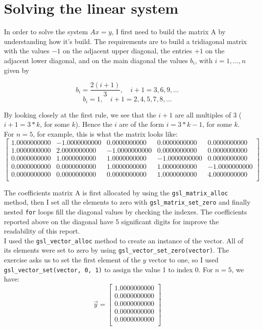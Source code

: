 \documentclass{article}
\newcommand{\code}{\texttt}
\begin{document}
\section{Solving the linear system}
In order to solve the system $Ax=y$, I first need to build the matrix A by understanding how it's build. The requirements are to build a tridiagonal matrix with the values $-1$ on the adjacent upper diagonal, the entries $+1$ on the adjacent lower diagonal, and on the main diagonal the values $b_{i}$, with $i = 1, \ldots, n$ given by

$$b_i =\frac{2(i+1)}{3},\quad i + 1= 3, 6, 9,\ldots$$
$$b_i =1,\quad i + 1 = 2, 4, 5, 7, 8, \ldots$$

By looking closely at the first rule, we see that the $i+1$ are all multiples of 3 ($i+1 = 3*k$, for some $k$). Hence the $i$ are of the form $i = 3*k-1$, for some $k$. For $n = 5$, for example, this is what the matrix looks like:
$$
\begin{bmatrix}
1.0000000000 & -1.0000000000 & 0.0000000000 & 0.0000000000 & 0.0000000000 \\
1.0000000000 & 2.0000000000 & -1.0000000000 & 0.0000000000 & 0.0000000000 \\
0.0000000000 & 1.0000000000 & 1.0000000000 & -1.0000000000 & 0.0000000000 \\ 
0.0000000000 & 0.0000000000 & 1.0000000000 & 1.0000000000 & -1.0000000000 \\ 
0.0000000000 & 0.0000000000 & 0.0000000000 & 1.0000000000 & 4.0000000000 \\\end{bmatrix}
$$

The coefficients matrix A is first allocated by using the \code{gsl\_matrix\_alloc} method, then I set all the elements to zero with \code{gsl\_matrix\_set\_zero} and finally nested \code{for} loops fill the diagonal values by checking the indexes. The coefficients reported above on the diagonal have 5 significant digits for improve the readability of this report.\\

I used the \code{gsl\_vector\_alloc} method to create an instance of the vector. All of its elements were set to zero by using \code{gsl\_vector\_set\_zero(vector)}. The exercise asks us to set the first element of the $y$ vector to one, so I used \code{gsl\_vector\_set(vector, 0, 1)} to assign the value 1 to index 0. For $n=5$, we have:
$$
\vec{y}=
\begin{bmatrix}
1.0000000000 \\
0.0000000000 \\
0.0000000000 \\
0.0000000000 \\
0.0000000000 \\
\end{bmatrix}
$$
\end{document}
